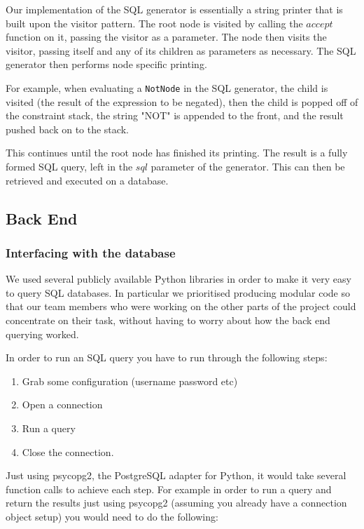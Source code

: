\documentclass[a4paper, 11pt]{article}
\begin{document}
        Our implementation of the SQL generator is essentially a string
        printer that is built upon the visitor pattern. The root node is
        visited by calling the $accept$ function on it, passing the visitor as
        a parameter. The node then visits the visitor, passing itself and any
        of its children as parameters as necessary. The SQL generator then
        performs node specific printing. 

        For example, when evaluating a \texttt{NotNode} in the SQL generator, the child
        is visited (the result of the expression to be negated), then the child
        is popped off of the constraint stack, the string "NOT" is appended to
        the front, and the result pushed back on to the stack.

        This continues until the root node has finished its printing. The
        result is a fully formed SQL query, left in the $sql$ parameter of the
        generator. This can then be retrieved and executed on a database.

    \subsection{Back End}

    \subsubsection{Interfacing with the database}

      We used several publicly available Python libraries in order to make 
      it very easy to query SQL databases. In particular we prioritised
      producing modular code so that our team members who were working on the
      other parts of the project could concentrate on their task, without having
      to worry about how the back end querying worked.

      In order to run an SQL query you have to run through the following steps:
      
      \begin{enumerate}
        \item Grab some configuration (username password etc)
        \item Open a connection
        \item Run a query
        \item Close the connection.
      \end{enumerate}

      Just using psycopg2, the PostgreSQL adapter for Python, it would take
      several function calls to achieve each step. For example in order to run a
      query and return the results just using psycopg2 (assuming you already
      have a connection object setup) you would need to do the following:
\end{document}
